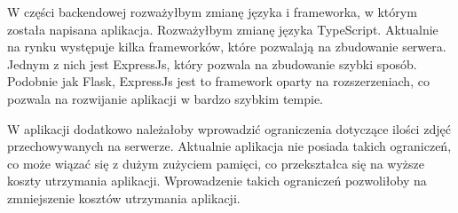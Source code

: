 W części backendowej rozważyłbym zmianę języka i frameworka, w którym została napisana aplikacja. Rozważyłbym zmianę języka TypeScript. Aktualnie na rynku występuje kilka frameworków, które pozwalają na zbudowanie serwera. Jednym z nich jest ExpressJs, który pozwala na zbudowanie szybki sposób. Podobnie jak Flask, ExpressJs jest to framework oparty na rozszerzeniach, co pozwala na rozwijanie aplikacji w bardzo szybkim tempie.

W aplikacji dodatkowo należałoby wprowadzić ograniczenia dotyczące ilości zdjęć przechowywanych na serwerze. Aktualnie aplikacja nie posiada takich ograniczeń, co może wiązać się z dużym zużyciem pamięci, co przekształca się na wyższe koszty utrzymania aplikacji. Wprowadzenie takich ograniczeń pozwoliłoby na zmniejszenie kosztów utrzymania aplikacji.
